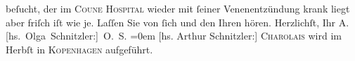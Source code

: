 \begin{ledgroupsized}[t]{13cm}
{                  beſucht}{}\label{K_L01606-1h}, der im
                  \textsc{Co{\geminationm}une Hospital} wieder mit ſeiner Venenentzündung krank liegt aber friſch iſt wie je.\pend
           \pstart
           Laſſen Sie von ſich und den Ihren hören. Herzlichſt,\pend
           \pstart
           Ihr \spacefill\mbox{A.}{\\[\baselineskip]}\spacefill\mbox{{[}hs. Olga Schnitzler:{]} O. S.}\pend
           \leftskip=0em{}\pstart
           {[}hs. Arthur Schnitzler:{]} \textsc{Charolais} wird im Herbſt in \textsc{Kopenhagen} aufgeführt.\pend
           
         
         \endnumbering{}\end{ledgroupsized}  \newcommand{\dateiname}{L01606}\newcommand{\titel}{Arthur und Olga Schnitzler an Richard Beer-Hofmann, 3. 7. 1906}\newcommand{\editorInnen}{Martin Anton Müller und Gerd-Hermann Susen}
      